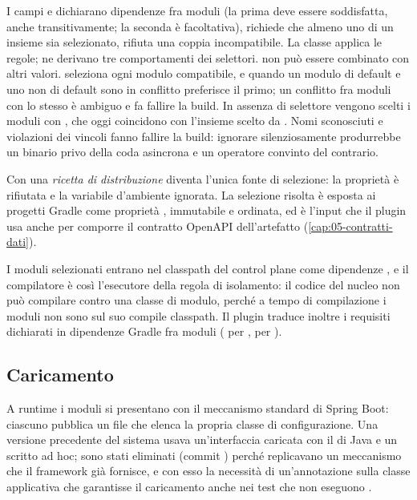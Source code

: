I campi  e  dichiarano dipendenze
fra moduli (la prima deve essere soddisfatta, anche transitivamente; la
seconda \`e facoltativa),  richiede che almeno uno di un
insieme sia selezionato,  rifiuta una coppia incompatibile. La
classe  applica le regole; ne derivano tre
comportamenti dei selettori.  non pu\`o essere combinato con altri
valori.  seleziona ogni modulo compatibile, e quando un modulo di
default e uno non di default sono in conflitto preferisce il primo; un conflitto
fra moduli con lo stesso  \`e ambiguo e fa fallire la
build. In assenza di selettore vengono scelti i moduli con
, che oggi coincidono con l'insieme scelto da
. Nomi sconosciuti e violazioni dei vincoli fanno fallire la build:
ignorare silenziosamente  produrrebbe un
binario privo della coda asincrona e un operatore convinto del contrario.

Con  una \emph{ricetta di distribuzione} diventa l'unica
fonte di selezione: la propriet\`a  \`e rifiutata e la
variabile d'ambiente ignorata. La selezione risolta \`e esposta ai progetti
Gradle come propriet\`a ,
immutabile e ordinata, ed \`e l'input che il plugin usa anche per comporre
il contratto OpenAPI dell'artefatto (\cref{cap:05-contratti-dati}).

I moduli selezionati entrano nel classpath del control plane come dipendenze
, e il compilatore \`e cos\`i l'esecutore della regola di
isolamento: il codice del nucleo non pu\`o compilare contro una classe di
modulo, perch\'e a tempo di compilazione i moduli non sono sul suo compile
classpath. Il plugin traduce inoltre i requisiti dichiarati in dipendenze
Gradle fra moduli ( per ,
 per ).

\subsection{Caricamento}

A runtime i moduli si presentano con il meccanismo standard di Spring Boot:
ciascuno pubblica un file
che elenca la propria classe di configurazione. Una versione precedente del
sistema usava un'interfaccia  caricata con il
 di Java e un  scritto ad hoc;
sono stati eliminati (commit ) perch\'e replicavano un
meccanismo che il framework gi\`a fornisce, e con esso la necessit\`a di
un'annotazione  sulla classe applicativa che garantisse il
caricamento anche nei test che non eseguono .

